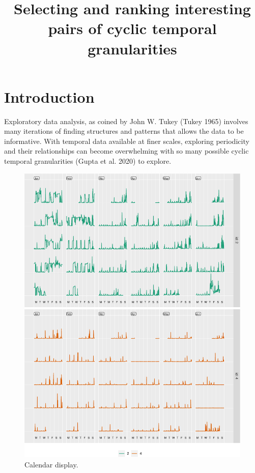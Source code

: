 \documentclass[
]{article}
\title{Selecting and ranking interesting pairs of cyclic temporal granularities}
\author{}
\date{\vspace{-2.5em}}
\begin{document}
\maketitle

{
\setcounter{tocdepth}{2}
\tableofcontents
}
\hypertarget{introduction}{%
\section{Introduction}\label{introduction}}

Exploratory data analysis, as coined by John W. Tukey (Tukey 1965) involves many iterations of finding structures and patterns that allows the data to be informative. With temporal data available at finer scales, exploring periodicity and their relationships can become overwhelming with so many possible cyclic temporal granularities (Gupta et al. 2020) to explore.

\begin{figure}

{\centering \includegraphics[width=\textwidth]{figure/calendar-elec-1} 

}

\caption{Calendar display.}\label{fig:calendar-elec}
\end{figure}
\end{document}
